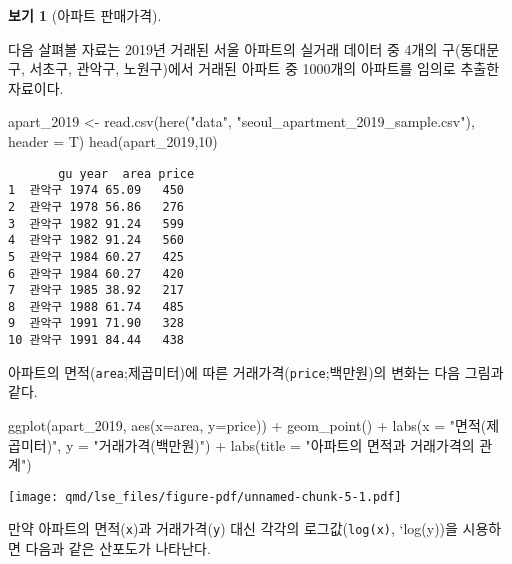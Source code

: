 \documentclass[
  11pt,
  a4paper,
  oneside]{scrbook}
\newenvironment{Shaded}{\begin{snugshade}}{\end{snugshade}}
\newcommand{\AttributeTok}[1]{\textcolor[rgb]{0.40,0.45,0.13}{#1}}
\newcommand{\DecValTok}[1]{\textcolor[rgb]{0.68,0.00,0.00}{#1}}
\newcommand{\FunctionTok}[1]{\textcolor[rgb]{0.28,0.35,0.67}{#1}}
\newcommand{\NormalTok}[1]{\textcolor[rgb]{0.00,0.23,0.31}{#1}}
\newcommand{\OtherTok}[1]{\textcolor[rgb]{0.00,0.23,0.31}{#1}}
\newcommand{\SpecialCharTok}[1]{\textcolor[rgb]{0.37,0.37,0.37}{#1}}
\newcommand{\StringTok}[1]{\textcolor[rgb]{0.13,0.47,0.30}{#1}}
\theoremstyle{definition}
\theoremstyle{plain}
\theoremstyle{definition}
\theoremstyle{definition}
\newtheorem{example}{보기}[chapter]
\theoremstyle{remark}
\begin{document}
\begin{example}[아파트
판매가격]\protect\hypertarget{exm-lse-simple-2}{}\label{exm-lse-simple-2}

다음 살펴볼 자료는 2019년 거래된 서울 아파트의 실거래 데이터 중 4개의
구(동대문구, 서초구, 관악구, 노원구)에서 거래된 아파트 중 1000개의
아파트를 임의로 추출한 자료이다.

\begin{Shaded}
\begin{Highlighting}[]
\NormalTok{apart\_2019 }\OtherTok{\textless{}{-}} \FunctionTok{read.csv}\NormalTok{(}\FunctionTok{here}\NormalTok{(}\StringTok{"data"}\NormalTok{, }\StringTok{"seoul\_apartment\_2019\_sample.csv"}\NormalTok{), }\AttributeTok{header =}\NormalTok{ T)}
\FunctionTok{head}\NormalTok{(apart\_2019,}\DecValTok{10}\NormalTok{)}
\end{Highlighting}
\end{Shaded}

\begin{verbatim}
       gu year  area price
1  관악구 1974 65.09   450
2  관악구 1978 56.86   276
3  관악구 1982 91.24   599
4  관악구 1982 91.24   560
5  관악구 1984 60.27   425
6  관악구 1984 60.27   420
7  관악구 1985 38.92   217
8  관악구 1988 61.74   485
9  관악구 1991 71.90   328
10 관악구 1991 84.44   438
\end{verbatim}

아파트의 면적(\texttt{area};제곱미터)에 따른
거래가격(\texttt{price};백만원)의 변화는 다음 그림과 같다.

\begin{Shaded}
\begin{Highlighting}[]
\FunctionTok{ggplot}\NormalTok{(apart\_2019, }\FunctionTok{aes}\NormalTok{(}\AttributeTok{x=}\NormalTok{area, }\AttributeTok{y=}\NormalTok{price)) }\SpecialCharTok{+} \FunctionTok{geom\_point}\NormalTok{() }\SpecialCharTok{+} \FunctionTok{labs}\NormalTok{(}\AttributeTok{x =} \StringTok{"면적(제곱미터)"}\NormalTok{, }\AttributeTok{y =} \StringTok{"거래가격(백만원)"}\NormalTok{) }\SpecialCharTok{+}
   \FunctionTok{labs}\NormalTok{(}\AttributeTok{title =} \StringTok{"아파트의 면적과 거래가격의 관계"}\NormalTok{)}
\end{Highlighting}
\end{Shaded}

\texttt{[image: qmd/lse\_files/figure-pdf/unnamed-chunk-5-1.pdf]}

만약 아파트의 면적(\texttt{x})과 거래가격(\texttt{y}) 대신 각각의
로그값(\texttt{log(x)}, `log(y))을 시용하면 다음과 같은 산포도가
나타난다.


\end{example}
\end{document}
